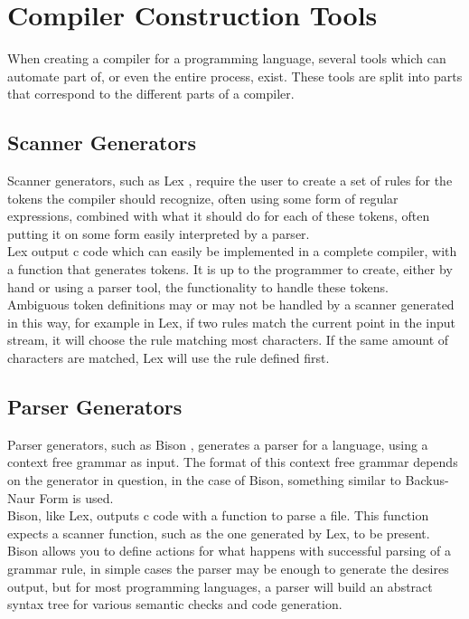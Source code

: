 \section{Compiler Construction Tools}

  When creating a compiler for a programming language, several tools which can automate part
  of, or even the entire process, exist. These tools are split into parts that correspond to 
  the different parts of a compiler.
  
  \subsection{Scanner Generators}
  
    Scanner generators, such as Lex \cite{yacchome1}, require the user to create a set of rules
    for the tokens the compiler should recognize, often using some form of regular expressions,
    combined with what it should do for each of these tokens, often putting it on some form
    easily interpreted by a parser.
    \\
    Lex output c code which can easily be implemented in a complete compiler, with a function that
    generates tokens. It is up to the programmer to create, either by hand or using a parser
    tool, the functionality to handle these tokens.
    \\
    Ambiguous token definitions may or may not be handled by a scanner generated in this way,
    for example in Lex, if two rules match the current point in the input stream, it will
    choose the rule matching most characters. If the same amount of characters are matched,
    Lex will use the rule defined first.
    
  \subsection{Parser Generators}
    
    Parser generators, such as Bison \cite{yacchome2}, generates a parser for a language, using a
    context free grammar as input. The format of this context free grammar depends on the
    generator in question, in the case of Bison, something similar to Backus-Naur Form is used.
    \\
    Bison, like Lex, outputs c code with a function to parse a file. This function expects a
    scanner function, such as the one generated by Lex, to be present. Bison allows you to define
    actions for what happens with successful parsing of a grammar rule, in simple cases the parser
    may be enough to generate the desires output, but for most programming languages, a parser will
    build an abstract syntax tree for various semantic checks and code generation.
    
